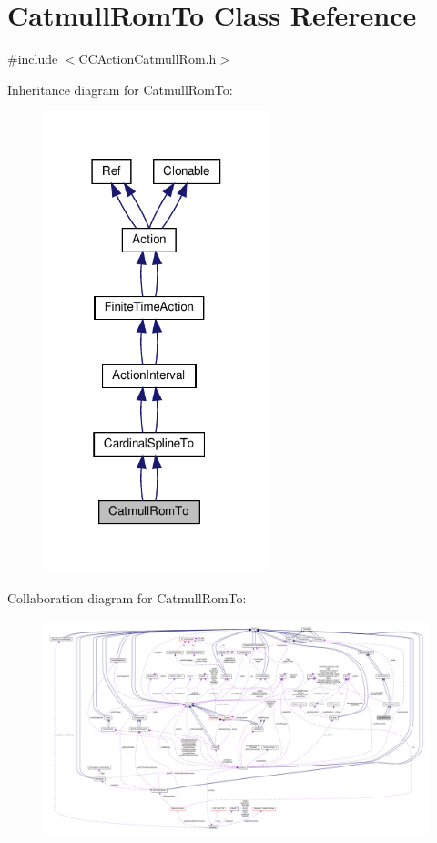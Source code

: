 \hypertarget{classCatmullRomTo}{}\section{Catmull\+Rom\+To Class Reference}
\label{classCatmullRomTo}


{\ttfamily \#include $<$C\+C\+Action\+Catmull\+Rom.\+h$>$}



Inheritance diagram for Catmull\+Rom\+To\+:
\nopagebreak
\begin{figure}[H]
\begin{center}
\leavevmode
\includegraphics[width=186pt]{classCatmullRomTo__inherit__graph}
\end{center}
\end{figure}


Collaboration diagram for Catmull\+Rom\+To\+:
\nopagebreak
\begin{figure}[H]
\begin{center}
\leavevmode
\includegraphics[width=350pt]{classCatmullRomTo__coll__graph}
\end{center}
\end{figure}
